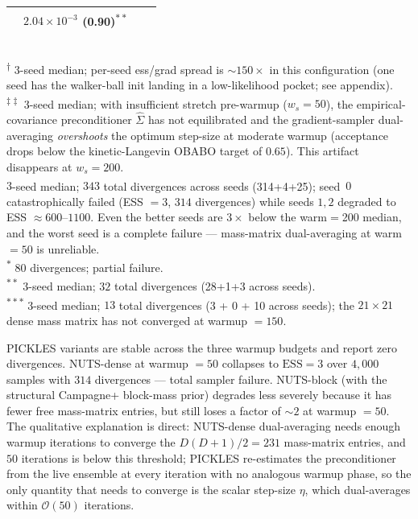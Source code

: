\documentclass{article}
\begin{document}
\begin{table}[t]
\begin{tabular}{l rrr}
   & $2.04\!\times\!10^{-3}$ (0.90)\textsuperscript{$\ast\ast$}\\
\bottomrule
\end{tabular}
\\[2pt]
\footnotesize
\textsuperscript{$\dag$} 3-seed median; per-seed ess/grad spread is
$\sim\!150\times$ in this configuration (one seed has the walker-ball
init landing in a low-likelihood pocket; see appendix). \\
\textsuperscript{$\ddag\ddag$} 3-seed median; with insufficient
stretch pre-warmup ($w_s = 50$), the empirical-covariance preconditioner
$\hat{\Sigma}$ has not equilibrated and the gradient-sampler dual-averaging
\emph{overshoots} the optimum step-size at moderate warmup
(acceptance drops below the kinetic-Langevin OBABO target of $0.65$).
This artifact disappears at $w_s = 200$. \\
\textsuperscript{\ddag} $3$-seed median; $343$ total divergences across
seeds (314+4+25); seed~$0$ catastrophically failed (ESS $=3$,
$314$ divergences) while seeds $1,2$ degraded to ESS $\approx 600$--$1100$.
Even the better seeds are $3\!\times$ below the warm$=$200 median, and
the worst seed is a complete failure --- mass-matrix dual-averaging at
warm $=50$ is unreliable.\\
\textsuperscript{$\ast$} $80$ divergences; partial failure.\\
\textsuperscript{$\ast\ast$} $3$-seed median; $32$ total divergences (28+1+3 across seeds).\\
\textsuperscript{$\ast\ast\ast$} 3-seed median; $13$ total divergences
(3 + 0 + 10 across seeds); the $21\times 21$ dense mass matrix has
not converged at warmup $=150$.
\end{table}

PICKLES variants are stable across the three warmup budgets and
report zero divergences. NUTS-dense at warmup $=50$ collapses to
$\text{ESS}\!=\!3$ over $4{,}000$ samples with $314$ divergences —
total sampler failure. NUTS-block (with the structural Campagne+
block-mass prior) degrades less severely because it has fewer free
mass-matrix entries, but still loses a factor of $\sim\!2$ at
warmup $=50$. The qualitative explanation is direct: NUTS-dense
dual-averaging needs enough warmup iterations to converge the
$D(D\!+\!1)/2 = 231$ mass-matrix entries, and $50$ iterations is
below this threshold; PICKLES re-estimates the preconditioner from
the live ensemble at every iteration with no analogous warmup phase,
so the only quantity that needs to converge is the scalar step-size
$\eta$, which dual-averages within $\mathcal{O}(50)$ iterations.
\end{document}
